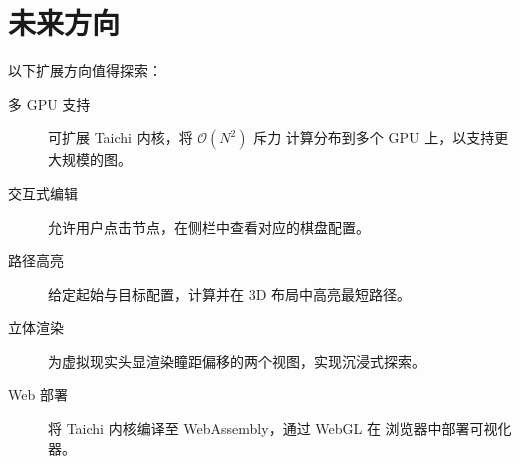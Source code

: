 \documentclass[11pt,a4paper]{report}
\begin{document}
\section{未来方向}
\label{sec:future}
以下扩展方向值得探索：
\begin{description}
    \item[多 GPU 支持] 可扩展 Taichi 内核，将 $\mathcal{O}(N^2)$ 斥力
        计算分布到多个 GPU 上，以支持更大规模的图。
    \item[交互式编辑] 允许用户点击节点，在侧栏中查看对应的棋盘配置。
    \item[路径高亮] 给定起始与目标配置，计算并在 3D 布局中高亮最短路径。
    \item[立体渲染] 为虚拟现实头显渲染瞳距偏移的两个视图，实现沉浸式探索。
    \item[Web 部署] 将 Taichi 内核编译至 WebAssembly，通过 WebGL 在
        浏览器中部署可视化器。
\end{description}

\end{document}
